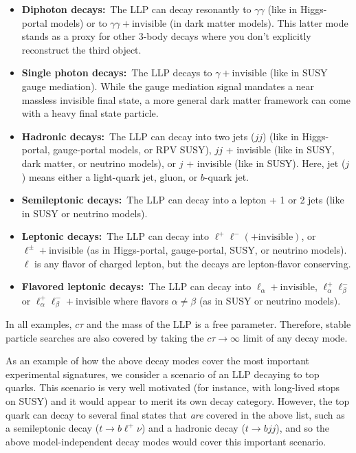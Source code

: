 \begin{itemize}
\item {\bf Diphoton decays:}~The LLP can decay resonantly to $\gamma\gamma$ (like in Higgs-portal models) or to $\gamma\gamma+\mathrm{invisible}$ (in dark matter models). This latter mode stands as a proxy for other 3-body decays where you don't explicitly reconstruct the third object.
\item {\bf Single photon decays:}~The LLP decays to $\gamma+\mathrm{invisible}$ (like in SUSY gauge mediation).  While the gauge mediation signal mandates a near massless invisible final state, a more general dark matter framework can come with a heavy final state particle.
\item {\bf Hadronic decays:}~The LLP can decay into two jets ($jj$) (like in Higgs-portal, gauge-portal models, or RPV SUSY), $jj$ + invisible (like in SUSY, dark matter, or neutrino models), or $j$ + invisible (like in SUSY). Here, jet ($j$) means either a light-quark jet, gluon, or $b$-quark jet.
\item {\bf Semileptonic decays:}~The LLP can decay into a lepton + 1 or 2 jets (like in SUSY or neutrino models).
\item {\bf Leptonic decays:}~The LLP can decay into $\ell^+\ell^-(+\mathrm{invisible})$, or $\ell^\pm+\mathrm{invisible}$ (as in Higgs-portal, gauge-portal, SUSY, or neutrino models). $\ell$ is any flavor of charged lepton, but the decays are lepton-flavor conserving.
\item {\bf Flavored leptonic decays:}~The LLP can decay into $\ell_\alpha+\mathrm{invisible}$, $\ell_\alpha^+\ell_\beta^-$ or $\ell_\alpha^+\ell_\beta^-+\mathrm{invisible}$ where flavors $\alpha\neq\beta$ (as in SUSY or neutrino models).
\end{itemize}


In all examples, $c\tau$ and the mass of the LLP is a free parameter. Therefore, stable particle searches are also covered by taking the $c\tau\rightarrow\infty$ limit of any decay mode. 

As an example of how the above decay modes cover the most important experimental signatures, we consider a scenario of an LLP decaying to top quarks. This scenario is very well motivated (for instance, with long-lived stops on SUSY) and it would appear to merit its own decay category. However, the top quark can decay to several final states that \emph{are} covered in the above list, such as a semileptonic decay ($t\rightarrow b\ell^+\nu$) and a hadronic decay ($t\rightarrow bjj$), and so the above model-independent decay modes would cover this important scenario.

